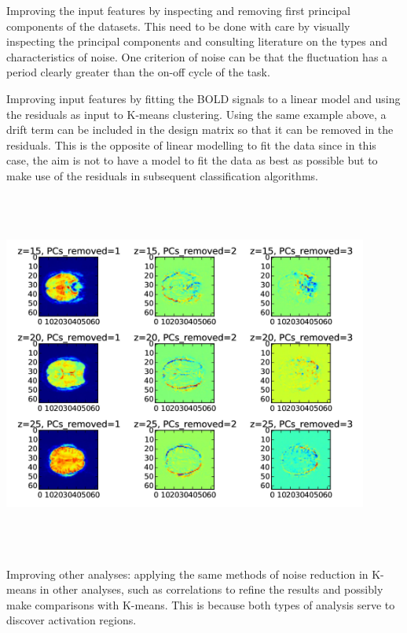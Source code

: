 \documentclass[11pt]{article}
\begin{document}
Improving the input features by inspecting and removing first principal
components of the datasets. This need to be done with care by visually
inspecting the principal components and consulting literature on the types and
characteristics of noise. One criterion of noise can be that the fluctuation 
has
a period clearly greater than the on-off cycle of the task. 

Improving input features by fitting the BOLD signals to a linear model and 
using
the residuals as input to K-means clustering. Using the same example above, a
drift term can be included in the design matrix so that it can be removed in 
the
residuals. This is the opposite of linear modelling to fit the data since in
this case, the aim is not to have a model to fit the data as best as possible
but to make use of the residuals in subsequent classification algorithms.

\centering
\includegraphics[width=12cm, height=12cm]{first_pcs_removed.jpg}

Improving other analyses: applying the same methods of noise reduction in
K-means in other analyses, 
such as correlations to refine the results and possibly make comparisons with
K-means. This is because both types of analysis serve to discover activation
regions. 
\end{document}
